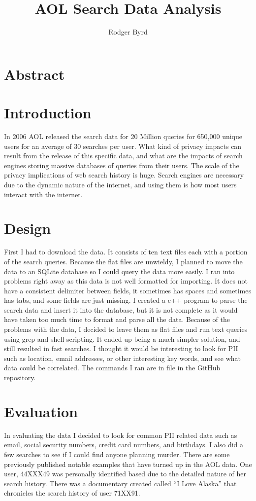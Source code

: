 \documentclass{article}
\begin{document}
\raggedright

\title{AOL Search Data Analysis}
\author{Rodger Byrd}
\maketitle

\section{Abstract}

\section{Introduction}
In 2006 AOL released the search data for 20 Million queries for 650,000 unique users for an average of 30 searches per user. What kind of privacy impacts can result from the release of this specific data, and what are the impacts of search engines storing massive databases of queries from their users. The scale of the privacy implications of web search history is huge. Search engines are necessary due to the dynamic nature of the internet, and using them is how most users interact with the internet.

\section{Design}
First I had to download the data\cite{aol}. It consists of ten text files each with a portion of the search queries. Because the flat files are unwieldy, I planned to move the data to an SQLite database so I could query the data more easily. I ran into problems right away as this data is not well formatted for importing.  It does not have a consistent delimiter between fields, it sometimes has spaces and sometimes has tabs, and some fields are just missing. I created a c++ program to parse the search data and insert it into the database, but it is not complete as it would have taken too much time to format and parse all the data. Because of the problems with the data, I decided to leave them as flat files and run text queries using grep and shell scripting. It ended up being a much simpler solution, and still resulted in fast searches. I thought it would be interesting to look for PII such as location, email addresses, or other interesting key words, and see what data could be correlated. The commands I ran are in  file in the GitHub repository\cite{git}.

\section{Evaluation}
In evaluating the data I decided to look for common PII related data such as email, social security numbers, credit card numbers, and birthdays. I also did a few searches to see if I could find anyone planning murder. There are some previously published notable examples that have turned up in the AOL data. One user, 44XXX49 was personally identified based due to the detailed nature of her search history\cite{nyt}. There was a documentary created called “I Love Alaska” that chronicles the search history of user 71XX91\cite{imdb}.
\end{document}
